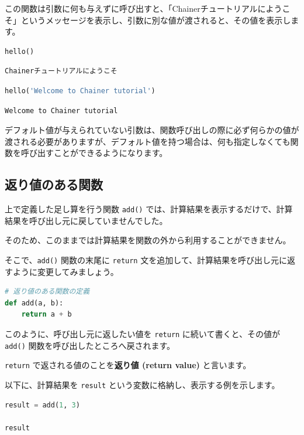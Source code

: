 この関数は引数に何も与えずに呼び出すと、「Chainerチュートリアルにようこそ」というメッセージを表示し、引数に別な値が渡されると、その値を表示します。


\begin{lstlisting}[style=codecell,language=Python]
hello()
\end{lstlisting}

\begin{lstlisting}[style=outputcell]
Chainerチュートリアルにようこそ
\end{lstlisting}

\begin{lstlisting}[style=codecell,language=Python]
hello('Welcome to Chainer tutorial')
\end{lstlisting}

\begin{lstlisting}[style=outputcell]
Welcome to Chainer tutorial
\end{lstlisting}

デフォルト値が与えられていない引数は、関数呼び出しの際に必ず何らかの値が渡される必要がありますが、デフォルト値を持つ場合は、何も指定しなくても関数を呼び出すことができるようになります。


\subsection{返り値のある関数}


上で定義した足し算を行う関数 \texttt{add()} では、計算結果を表示するだけで、計算結果を呼び出し元に戻していませんでした。

そのため、このままでは計算結果を関数の外から利用することができません。


そこで、\texttt{add()} 関数の末尾に \texttt{return} 文を追加して、計算結果を呼び出し元に返すように変更してみましょう。


\begin{lstlisting}[style=codecell,language=Python]
# 返り値のある関数の定義
def add(a, b):
    return a + b
\end{lstlisting}

このように、呼び出し元に返したい値を \texttt{return} に続いて書くと、その値が \texttt{add()} 関数を呼び出したところへ戻されます。

\texttt{return} で返される値のことを\textbf{返り値 (return value)} と言います。


以下に、計算結果を \texttt{result} という変数に格納し、表示する例を示します。


\begin{lstlisting}[style=codecell,language=Python]
result = add(1, 3)

result
\end{lstlisting}

